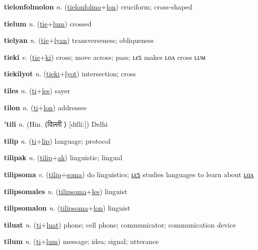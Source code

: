 \textbf{\hypertarget{tielonfolmolon}{tielonfolmolon}} \textit{n.} (\hyperlink{tielonfolmo}{tielonfolmo}+\allowbreak \hyperlink{lon}{lon})
cruciform; cross-shaped

\textbf{\hypertarget{tielum}{tielum}} \textit{n.} (\hyperlink{tie}{tie}+\allowbreak \hyperlink{lum}{lum})
crossed

\textbf{\hypertarget{tielyan}{tielyan}} \textit{n.} (\hyperlink{tie}{tie}+\allowbreak \hyperlink{lyan}{lyan})
transverseness; obliqueness

\textbf{\hypertarget{tieki}{tieki}} \textit{v.} (\hyperlink{tie}{tie}+\allowbreak \hyperlink{ki}{ki})
cross; move across; pass; ʟєꜱ makes ʟᴏᴧ cross ʟᴜᴍ

\textbf{\hypertarget{tiekilyot}{tiekilyot}} \textit{n.} (\hyperlink{tieki}{tieki}+\allowbreak \hyperlink{lyot}{lyot})
intersection; cross

\textbf{\hypertarget{tiles}{tiles}} \textit{n.} (\hyperlink{ti}{ti}+\allowbreak \hyperlink{les}{les})
sayer

\textbf{\hypertarget{tilon}{tilon}} \textit{n.} (\hyperlink{ti}{ti}+\allowbreak \hyperlink{lon}{lon})
addressee

\textbf{\hypertarget{'tili}{'tili}} \textit{n.} (Hin. ⟨{\devanagari{}दिल्ली }⟩ [dɪlliː])
Delhi

\textbf{\hypertarget{tilip}{tilip}} \textit{n.} (\hyperlink{ti}{ti}+\allowbreak \hyperlink{lip}{lip})
language; protocol

\textbf{\hypertarget{tilipak}{tilipak}} \textit{n.} (\hyperlink{tilip}{tilip}+\allowbreak \hyperlink{ak}{ak})
linguistic; lingual

\textbf{\hypertarget{tilipsoma}{tilipsoma}} \textit{v.} (\hyperlink{tilip}{tilip}+\allowbreak \hyperlink{soma}{soma})
do linguistics; \hyperlink{tilipsomales}{ʟєꜱ} studies languages to learn about \hyperlink{tilipsomalon}{ʟᴏᴧ}

\textbf{\hypertarget{tilipsomales}{tilipsomales}} \textit{n.} (\hyperlink{tilipsoma}{tilipsoma}+\allowbreak \hyperlink{les}{les})
linguist

\textbf{\hypertarget{tilipsomalon}{tilipsomalon}} \textit{n.} (\hyperlink{tilipsoma}{tilipsoma}+\allowbreak \hyperlink{lon}{lon})
linguist

\textbf{\hypertarget{tiluat}{tiluat}} \textit{n.} (\hyperlink{ti}{ti}+\allowbreak \hyperlink{luat}{luat})
phone; cell phone; communicator; communication device

\textbf{\hypertarget{tilum}{tilum}} \textit{n.} (\hyperlink{ti}{ti}+\allowbreak \hyperlink{lum}{lum})
message; idea; signal; utterance


